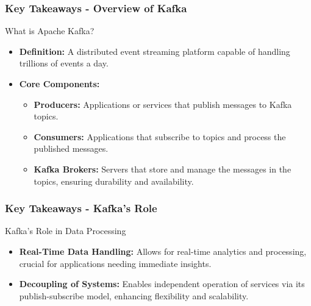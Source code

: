 \documentclass[aspectratio=169]{beamer}
\begin{document}
\begin{frame}[fragile]
    \frametitle{Key Takeaways - Overview of Kafka}
    \begin{block}{What is Apache Kafka?}
        \begin{itemize}
            \item \textbf{Definition:} A distributed event streaming platform capable of handling trillions of events a day.
            \item \textbf{Core Components:}
            \begin{itemize}
                \item \textbf{Producers:} Applications or services that publish messages to Kafka topics.
                \item \textbf{Consumers:} Applications that subscribe to topics and process the published messages.
                \item \textbf{Kafka Brokers:} Servers that store and manage the messages in the topics, ensuring durability and availability.
            \end{itemize}
        \end{itemize}
    \end{block}
\end{frame}

\begin{frame}[fragile]
    \frametitle{Key Takeaways - Kafka's Role}
    \begin{block}{Kafka's Role in Data Processing}
        \begin{itemize}
            \item \textbf{Real-Time Data Handling:} Allows for real-time analytics and processing, crucial for applications needing immediate insights.
            \item \textbf{Decoupling of Systems:} Enables independent operation of services via its publish-subscribe model, enhancing flexibility and scalability.
        \end{itemize}
    \end{block}
\end{frame}
\end{document}
